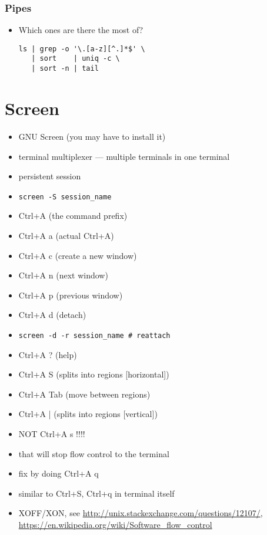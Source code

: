 \documentclass[%
        hyperref={%
                pdfauthor={Zakariyya Mughal},%
                pdfpagemode={None},pdfpagelayout={SinglePage}}%
        xcolor={x11names},%
]{beamer}
\begin{document}
\begin{frame}[fragile]
	\frametitle{Pipes}
	\begin{itemize}
		\item Which ones are there the most of?
\begin{lstlisting}
ls | grep -o '\.[a-z][^.]*$' \
   | sort    | uniq -c \
   | sort -n | tail
\end{lstlisting}
	\end{itemize}
\end{frame}


\section{Screen}\frame{\insertsection}
\begin{frame}
	\begin{itemize}
\item GNU Screen (you may have to install it)
\item terminal multiplexer --- multiple terminals in one terminal
\item persistent session
\pause\item \texttt{screen -S session\_name}
\item Ctrl+A (the command prefix)
\item Ctrl+A a (actual Ctrl+A)
\item Ctrl+A c (create a new window)
\item Ctrl+A n (next window)
\item Ctrl+A p (previous window)
\item Ctrl+A d (detach)
\item \texttt{screen -d -r session\_name \# reattach}
\item Ctrl+A ? (help)
	\end{itemize}
\end{frame}
\begin{frame}
\begin{itemize}
\item Ctrl+A S (splits into regions [horizontal])
\item Ctrl+A Tab (move between regions)
\item Ctrl+A | (splits into regions [vertical])

\pause\item NOT Ctrl+A s !!!!
\item that will stop flow control to the terminal
\item \qquad	fix by doing Ctrl+A q
\pause\item similar to Ctrl+S, Ctrl+q in terminal itself
\item XOFF/XON, see \url{http://unix.stackexchange.com/questions/12107/}, \url{https://en.wikipedia.org/wiki/Software_flow_control}
\end{itemize}
\end{frame}
\end{document}
